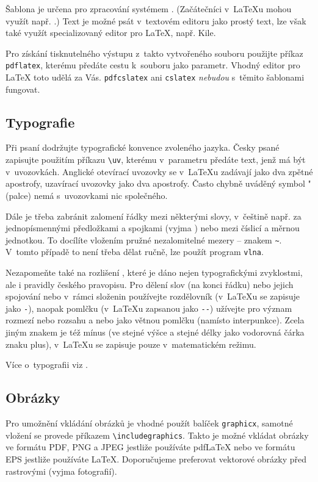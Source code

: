 \documentclass[thesis=B,czech]{FITthesis}[2012/10/20]
\begin{document}
Šablona je určena pro zpracování systémem \LaTeXe{}. (Začátečníci v~\LaTeX{}u mohou využít např. \cite{rybicka}.) Text je možné psát v~textovém editoru jako prostý text, lze však také využít specializovaný editor pro \LaTeX{}, např. Kile.

Pro získání tisknutelného výstupu z~takto vytvořeného souboru použijte příkaz \verb|pdflatex|, kterému předáte cestu k~souboru jako parametr. Vhodný editor pro \LaTeX{} toto udělá za Vás. \verb|pdfcslatex| ani \verb|cslatex| \emph{nebudou} s~těmito šablonami fungovat.

\subsection{Typografie}

Při psaní dodržujte typografické konvence zvoleného jazyka. Česky psané  zapisujte použitím příkazu \verb|\uv|, kterému v~parametru předáte text, jenž má být v~uvozovkách. Anglické otevírací uvozovky se v~\LaTeX{}u zadávají jako dva zpětné apostrofy, uzavírací uvozovky jako dva apostrofy. Často chybně uváděný symbol "{} (palce) nemá s~uvozovkami nic společného.

Dále je třeba zabránit zalomení řádky mezi některými slovy, v~češtině např. za jednopísmennými předložkami a spojkami (vyjma ) nebo mezi číslicí a měrnou jednotkou. To docílíte vložením pružné nezalomitelné mezery -- znakem \texttt{\textasciitilde}. V~tomto případě to není třeba dělat ručně, lze použít program \verb|vlna|.

Nezapomeňte také na rozlišení , které je dáno nejen typografickými zvyklostmi, ale i pravidly českého pravopisu. Pro dělení slov (na konci řádku) nebo jejich spojování nebo v~rámci složenin používejte rozdělovník (v~\LaTeX{}u se zapisuje jako \verb|-|), naopak pomlčku (v~\LaTeX{}u zapsanou jako \verb|--|) užívejte pro význam rozmezí nebo rozsahu a nebo jako větnou pomlčku (namísto interpunkce). Zcela jiným znakem je též mínus (ve stejné výšce a stejné délky jako vodorovná čárka znaku plus), v~\LaTeX{}u se zapisuje pouze v~matematickém režimu.

Více o~typografii viz \cite{kobltypo}.

\subsection{Obrázky}

Pro umožnění vkládání obrázků je vhodné použít balíček \verb|graphicx|, samotné vložení se provede příkazem \verb|\includegraphics|. Takto je možné vkládat obrázky ve formátu PDF, PNG a JPEG jestliže používáte pdf\LaTeX{} nebo ve formátu EPS jestliže používáte \LaTeX{}. Doporučujeme preferovat vektorové obrázky před rastrovými (vyjma fotografií).
\end{document}
